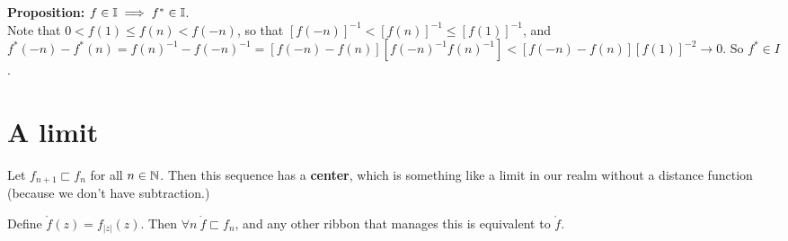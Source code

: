 \documentclass{article}
\renewcommand{\b}{\textbf}
\newcommand{\ribbons}{\Bbb I}
\newcommand{\forks}{ \sqsubset}
\renewcommand{\center}{\mathring f  }
\begin{document}
\begin{huge}
{{\b{Proposition:} $f \in \ribbons \implies f^* \in \ribbons$.\\


Note that $0 < f(1) \le f(n) < f(-n)$, so that $[f(-n)]^{-1} <  [f(n)]^{-1} \le [f(1)]^{-1}$, and $f^*(-n) - f^* (n) = f(n)^{-1} - f(-n)^{-1} = [f(-n) - f(n)][f(-n)^{-1}f(n)^{-1}] < [f(-n) - f(n)][f(1)]^{-2} \to 0$. So $f^* \in I$.\\

\section{A limit}

Let  $f_{n+1} \forks f_n$ for all $n \in \Bbb N$. Then this sequence has a \b{center}, which is something like a limit in our realm without a distance function (because we don't have subtraction.) 

Define $\center(z) =  f_{|z|}(z).$ Then $\forall n \ \center \forks f_n$, and any other ribbon that manages this is equivalent to $\center$.

}}

\end{huge}
\end{document}
